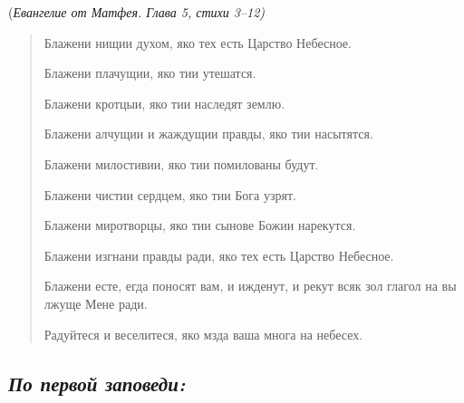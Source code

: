 (\itshape Евангелие от Матфея. Глава 5, стихи 3--12) 

\normalfont{}

\begin{quote}

Блажени нищии духом, яко тех есть Царство Небесное. 

Блажени плачущии, яко тии утешатся. 

Блажени кротцыи, яко тии наследят землю. 

Блажени алчущии и жаждущии правды, яко тии насытятся. 

Блажени милостивии, яко тии помилованы будут. 

Блажени чистии сердцем, яко тии Бога узрят. 

Блажени миротворцы, яко тии сынове Божии нарекутся. 

Блажени изгнани правды ради, яко тех есть Царство Небесное. 

Блажени есте, егда поносят вам, и ижденут, и рекут всяк зол глагол на вы лжуще Мене ради. 

Радуйтеся и веселитеся, яко мзда ваша многа на небесех. 
\end{quote}
\mychapterending

 

\subsection*{\itshape По первой заповеди:}

